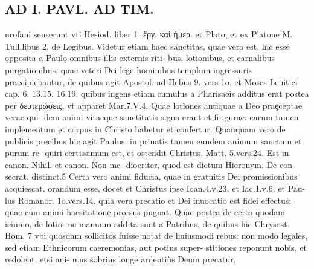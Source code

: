 \documentclass{article}
\begin{document}
\begin{pages}
\section*{AD I. PAVL. AD TIM. }
\marginpar{[ p.66 ]}\pstart nrofani senserunt vti Hesiod. liber 1. ἔργ. καὶ ἠμερ. et Plato, et ex Platone M. Tull.libus 2. de Legibus.  \pend\pstart Videtur etiam haec sanctitas, quae vera est, hic esse opposita a Paulo omnibus illis externis riti- bus, lotionibus, et carnalibus purgationibus, quae veteri Dei lege hominibus templum ingressuris praecipiebantur, de quibus agit Apostol. ad Hebus  9. vers 1o. et Moses Leuitici cap. 6. 13.15. 16.19. quibus ingens etiam cumulus a Pharisaeis additus erat postea per δευτερώσεις, vt apparet Mar.7.V.4. Quae lotìones antiquae a Deo praȩceptae verae qui- dem animi vitaeque sanctitatis signa erant et fi- gurae: earum tamen implementum et corpus in Christo habetur et confertur. Quanquam vero de publicis precibus hic agit Paulus: in priuatis tamen eundem animum sanctum et purum re- quiri certissimum est, et ostendit Christus. Matt. 5.vers.24. Est in canon. Nihil. et canon. Non me- diocriter, quod est dictum Hieronym. De con- secrat. distinct.5  \pend\pstart Certa vero animi fiducia, quae in gratuitis Dei promissionibus acquiescat, orandum esse, docet et Christus ipse Ioan.4.v.23, et Iac.1.v.6. et Pau- lus Romanor. 1o.vers.14. quia vera precatio et Dei inuocatio est fidei effectus: quae cum animi haesitatione prorsus pugnat.  \pend\pstart Quae postea de certo quodam ieiunio, de lotio- ne manuum addita sunt a Patribus, de quibus hic Chrysost. Hom. 7 vbi quosdam sollicitos fuisse notat de huiusmodi rebus: non modo legales, sed etiam Ethnicorum caeremonias, aut potius super- stitiones reponunt nobis, et redolent, etsi ani- mus sobrius longe ardentiùs Deum precatur,  \pend

\end{pages}
\end{document}
